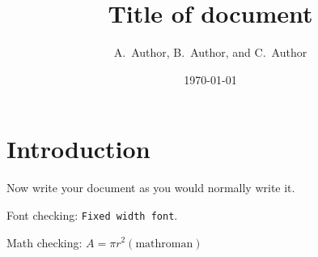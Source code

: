 \documentclass[DM,lsstdraft,toc]{lsstdoc}
\title[Short title]{Title of document}
\author{
A.~Author,
B.~Author,
and
C.~Author}
\date{\today}
\begin{document}
\maketitle

\section{Introduction}

Now write your document as you would normally write it.

Font checking: \texttt{Fixed width font}.

Math checking: $A = \pi r^2 \mathrm{(math roman)}$
\end{document}
